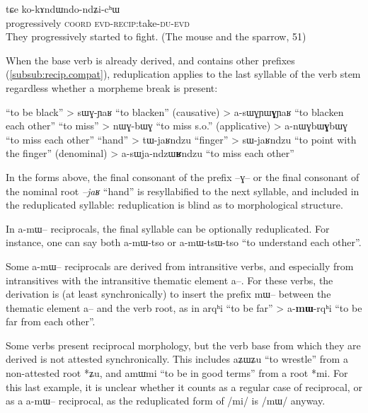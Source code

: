 \documentclass[oldfontcommands,oneside,a4paper,11pt]{memoir}
\newcommand{\ipa}[1]{{\phon #1}} %
\newcommand{\coord}{\textsc{coord}}
\newcommand{\du}{\textsc{du}}
\newcommand{\evd}{\textsc{evd}}
\newcommand{\recip}{\textsc{recip}}
\begin{document}
\begin{exe}
\ex
\gll \ipa{ʑɯrɯʑari} 	\ipa{tɕe} 	\ipa{ko-kɤndɯndo-ndʑi-cʰɯ}         \\
       progressively \coord{} \evd{}-\recip{}:take-\du{}-\evd{}    \\
 \glt They progressively started to fight.   (The mouse and the sparrow, 51)
\end{exe} 
 
 

When the base verb is already derived, and contains other prefixes (\ref{subsub:recip.compat}), reduplication applies to the last syllable of the verb stem regardless whether a morpheme break is present:
\begin{exe}
\ex
 \glt \ipa{ɲaʁ} ``to be black'' > \ipa{sɯɣ-ɲaʁ} ``to blacken'' (causative)
  \glt > \ipa{a-sɯɣɲɯ\textbf{ɣ}ɲaʁ} ``to blacken each other''
 \glt \ipa{bɯɣ} ``to miss'' > \ipa{nɯɣ-bɯɣ} ``to miss s.o.'' (applicative)
  \glt > \ipa{a-nɯɣbɯ\textbf{ɣ}bɯɣ} ``to miss each other''
 \glt \ipa{tɯ-jaʁ} ``hand'' > \ipa{tɯ-jaʁndzu} ``finger''  > \ipa{sɯ-jaʁndzu} ``to point with the finger''  (denominal)
  \glt > \ipa{a-sɯja-ndzɯ\textbf{ʁ}ndzu} ``to miss each other''
\end{exe} 

In the forms above, the final consonant of the prefix --\ipa{ɣ}-- or the final consonant of the nominal root \textit{--jaʁ} ``hand'' is resyllabified to the next syllable, and included in the reduplicated syllable: reduplication is blind as to morphological structure.

In \ipa{a-mɯ}-- reciprocals, the final syllable can be optionally reduplicated. For instance, one can say both  \ipa{a-mɯ-tso} or  \ipa{a-mɯ-tsɯ-tso} ``to understand each other''.

Some \ipa{a-mɯ}-- reciprocals are derived from intransitive verbs, and especially from intransitives with the intransitive thematic element \ipa{a}--. For these verbs, the derivation is (at least synchronically) to insert the prefix \ipa{mɯ}-- between the thematic element \ipa{a}-- and the verb root, as in \ipa{arqʰi} ``to be far'' > \ipa{a-\textbf{mɯ}-rqʰi} ``to be far from each other''.

Some verbs present reciprocal morphology, but the verb base from which they are derived is not attested synchronically. This includes \ipa{aʑɯʑu} ``to wrestle'' from a non-attested root *ʑu, and \ipa{amɯmi} ``to be in good terms'' from a root *mi. For this last example, it is unclear whether it counts as a regular case of reciprocal, or as a \ipa{a-mɯ}-- reciprocal, as the reduplicated form of /mi/ is /mɯ/ anyway.
\end{document}
